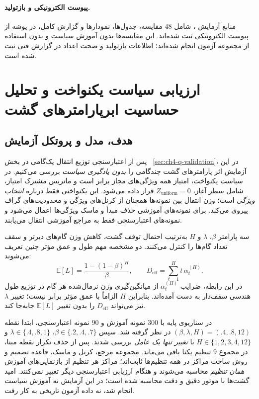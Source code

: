 \paragraph{پیوست الکترونیکی و بازتولید.}
منابع آزمایش ، شامل $48$ مقایسه، جدول‌ها، نمودارها و گزارش کامل، در پوشه  از پیوست الکترونیکی ثبت شده‌اند. این مقایسه‌ها بدون آموزش سیاست و بدون استفاده از مجموعه آزمون انجام شده‌اند؛ اطلاعات بازتولید و صحت اعداد در گزارش فنی ثبت شده است.

\section{ارزیابی سیاست یکنواخت و تحلیل حساسیت ابرپارامترهای گشت}
\label{sec:ch4-uniform-hyperparameter-sensitivity}

\subsection{هدف، مدل و پروتکل آزمایش}
\label{subsec:ch4-uniform-baseline}
پس از اعتبارسنجی توزیع انتقال یک‌گامی در بخش
~\ref{sec:ch4-q-validation}،
در این آزمایش اثر پارامترهای گشت چندگامی را
\emph{بدون یادگیری سیاست} بررسی می‌کنیم.
در سیاست یکنواخت، امتیاز همه ویژگی‌های مجاز
برابر است و ماتریس مشترک امتیاز، شامل سطر آغاز،
$Z_{\mathrm{uniform}}=0$ قرار داده می‌شود.
این یکنواختی فقط درباره \emph{انتخاب ویژگی}
است؛ وزن انتقال بین نمونه‌ها همچنان از
کرنل‌های ویژگی و محدودیت‌های گراف پیروی می‌کند.
برای نمونه‌های آموزشی حذف مبدأ و ماسک ویژگی‌ها
اعمال می‌شود و نمونه‌های اعتبارسنجی فقط به
مراجع آموزشی انتقال می‌یابند.

سه پارامتر $\beta$، $\lambda$ و $H$
به‌ترتیب احتمال توقف گشت، کاهش وزن گام‌های دیرتر
و سقف تعداد گام‌ها را کنترل می‌کنند.
دو مشخصه مهم طول و عمق مؤثر چنین تعریف می‌شوند:
\begin{equation}\label{eq:ch4-uniform-effective-depth}
\mathbb E[L]=\frac{1-(1-\beta)^H}{\beta},
\qquad
D_{\mathrm{eff}}=\sum_{t=1}^{H}
t\,\alpha_t^{(H)}.
\end{equation}
در این رابطه، ضرایب $\alpha_t^{(H)}$
از میانگین‌گیری وزن نرمال‌شده هر گام در
توزیع طول هندسی سقف‌دار به دست آمده‌اند.
بنابراین $H$ الزاماً با عمق مؤثر برابر نیست؛
تغییر $\lambda$ نیز می‌تواند
$D_{\mathrm{eff}}$ را بدون تغییر
$\mathbb E[L]$ جابه‌جا کند.

در سناریوی پایه با $300$ نمونه آموزش و
$90$ نمونه اعتبارسنجی، ابتدا نقطه
$(\beta,\lambda,H)=(.4,.8,12)$
در نظر گرفته شد. سپس
$\beta\in\{.2,.4,.7\}$،
$\lambda\in\{.4,.8,1\}$ و
$H\in\{1,2,3,4,12\}$
با \emph{تغییر تنها یک عامل} بررسی شدند.
پس از حذف تکرار نقطه مبنا، در مجموع
$9$ تنظیم یکتا باقی می‌ماند.
مجموعه مرجع، کرنل و ماسک،
قاعده تصمیم و روش ساخت مراکز
در همه تنظیم‌ها ثابت‌اند؛ مراکز هر تنظیم
از بازنمایی‌های آموزش \emph{همان تنظیم}
محاسبه می‌شوند و هنگام ارزیابی اعتبارسنجی
دیگر تغییر نمی‌کنند.
امید گشت‌ها با موتور دقیق و دقت
 محاسبه شده است؛
در این آزمایش نه آموزش سیاست انجام شد،
نه داده آزمون تاریخی به کار رفت.

